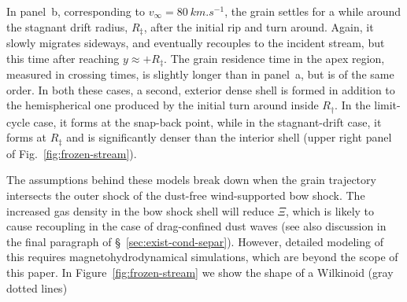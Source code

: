 In panel~b, corresponding to \(v_\infty = \SI{80}{km.s^{-1}}\), the grain
settles for a while around the stagnant drift radius, \(R_\ddag\), after
the initial rip and turn around.  Again, it slowly migrates sideways,
and eventually recouples to the incident stream, but this time after
reaching \(y \approx +R_\ddag\).  The grain residence time in the apex region,
measured in crossing times, is slightly longer than in panel~a, but is
of the same order.  In both these cases, a second, exterior dense
shell is formed in addition to the hemispherical one produced by the
initial turn around inside \(R_\dag\). In the limit-cycle case, it forms
at the snap-back point, while in the stagnant-drift case, it forms at
\(R_\ddag\) and is significantly denser than the interior shell (upper
right panel of Fig.~\ref{fig:frozen-stream}).

The assumptions behind these models break down when the grain
trajectory intersects the outer shock of the dust-free wind-supported
bow shock.  The increased gas density in the bow shock shell will
reduce \(\Xi\), which is likely to cause recoupling in the case of
drag-confined dust waves (see also discussion in the final paragraph
of \S~\ref{sec:exist-cond-separ}).  However, detailed modeling of this
requires magnetohydrodynamical simulations, which are beyond the scope
of this paper.  In Figure~\ref{fig:frozen-stream} we show the shape of
a Wilkinoid (gray dotted lines)




